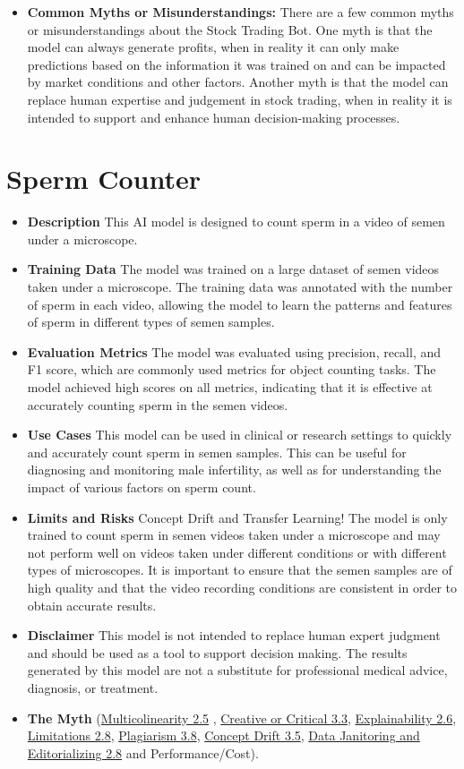 \begin{itemize}
    \item \textbf{Common Myths or Misunderstandings:} There are a few common myths or misunderstandings about the Stock Trading Bot. One myth is that the model can always generate profits, when in reality it can only make predictions based on the information it was trained on and can be impacted by market conditions and other factors. Another myth is that the model can replace human expertise and judgement in stock trading, when in reality it is intended to support and enhance human decision-making processes.
\end{itemize}

\section{Sperm Counter}

\begin{itemize}
    \item \textbf{Description} This AI model is designed to count sperm in a video of semen under a microscope.
    \item \textbf{Training Data} The model was trained on a large dataset of semen videos taken under a microscope. The training data was annotated with the number of sperm in each video, allowing the model to learn the patterns and features of sperm in different types of semen samples.
    \item \textbf{Evaluation Metrics} The model was evaluated using precision, recall, and F1 score, which are commonly used metrics for object counting tasks. The model achieved high scores on all metrics, indicating that it is effective at accurately counting sperm in the semen videos.
    \item \textbf{Use Cases} This model can be used in clinical or research settings to quickly and accurately count sperm in semen samples. This can be useful for diagnosing and monitoring male infertility, as well as for understanding the impact of various factors on sperm count.
    \item \textbf{Limits and Risks} Concept Drift and Transfer Learning! The model is only trained to count sperm in semen videos taken under a microscope and may not perform well on videos taken under different conditions or with different types of microscopes. It is important to ensure that the semen samples are of high quality and that the video recording conditions are consistent in order to obtain accurate results.
    \item \textbf{Disclaimer} This model is not intended to replace human expert judgment and should be used as a tool to support decision making. The results generated by this model are not a substitute for professional medical advice, diagnosis, or treatment.
    \item \textbf{The Myth} (\hyperref[sec:multi]{Multicolinearity 2.5} , \hyperref[sec:creative]{Creative or Critical 3.3}, \hyperref[sec:explain]{Explainability 2.6}, \hyperref[sec:limits]{Limitations 2.8}, \hyperref[sec:plag]{Plagiarism 3.8}, \hyperref[sec:drift]{Concept Drift 3.5}, \hyperref[sec:janitor]{Data Janitoring and Editorializing 2.8} and Performance/Cost).
\end{itemize}

